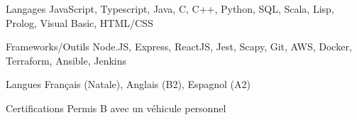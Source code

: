 
\begin{cvskills}
  \cvskill
    {Langages} %
    {JavaScript, Typescript, Java, C, C++, Python, SQL, Scala, Lisp, Prolog, Visual Basic, HTML/CSS} %

  \cvskill
    {Frameworks/Outils} %
    {Node.JS, Express, ReactJS, Jest, Scapy, Git, AWS, Docker, Terraform, Ansible, Jenkins} %
    
  \cvskill
    {Langues} %
    {Français (Natale), Anglais (B2), Espagnol (A2)} %
    
  \cvskill
    {Certifications} %
    {Permis B avec un véhicule personnel} %
\end{cvskills}
